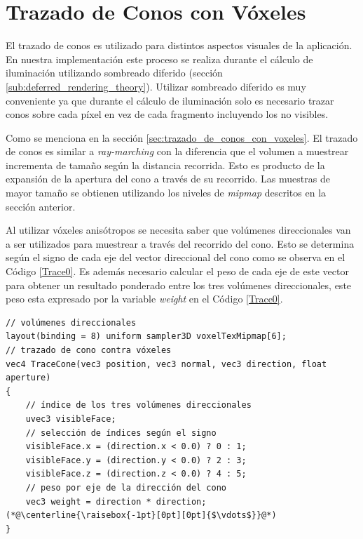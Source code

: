 \section{Trazado de Conos con Vóxeles} %
\label{sec:trazado_de_conos}
El trazado de conos es utilizado para distintos aspectos visuales de la aplicación. En nuestra implementación este proceso se realiza durante el cálculo de iluminación utilizando sombreado diferido (sección \ref{sub:deferred_rendering_theory}). Utilizar sombreado diferido es muy conveniente ya que durante el cálculo de iluminación solo es necesario trazar conos sobre cada píxel en vez de cada fragmento incluyendo los no visibles.

Como se menciona en la sección \ref{sec:trazado_de_conos_con_voxeles}. El trazado de conos es similar a \emph{ray-marching} con la diferencia que el volumen a muestrear incrementa de tamaño según la distancia recorrida. Esto es producto de la expansión de la apertura del cono a través de su recorrido. Las muestras de mayor tamaño se obtienen utilizando los niveles de \emph{mipmap} descritos en la sección anterior.

Al utilizar vóxeles anisótropos se necesita saber que volúmenes direccionales van a ser utilizados para muestrear a través del recorrido del cono. Esto se determina según el signo de cada eje del vector direccional del cono como se observa en el Código \ref{Trace0}. Es además necesario calcular el peso de cada eje de este vector para obtener un resultado ponderado entre los tres volúmenes direccionales, este peso esta expresado por la variable \emph{weight} en el Código \ref{Trace0}.
\\
\begin{lstlisting}[caption={Lógica para determinar volúmenes direccionales a utilizar durante el trazado de conos y peso por eje.}, label=Trace0]
// volúmenes direccionales
layout(binding = 8) uniform sampler3D voxelTexMipmap[6];
// trazado de cono contra vóxeles
vec4 TraceCone(vec3 position, vec3 normal, vec3 direction, float aperture)
{
    // índice de los tres volúmenes direccionales
    uvec3 visibleFace;
    // selección de índices según el signo
    visibleFace.x = (direction.x < 0.0) ? 0 : 1;
    visibleFace.y = (direction.y < 0.0) ? 2 : 3;
    visibleFace.z = (direction.z < 0.0) ? 4 : 5;
    // peso por eje de la dirección del cono
    vec3 weight = direction * direction;
(*@\centerline{\raisebox{-1pt}[0pt][0pt]{$\vdots$}}@*)
}
\end{lstlisting}

